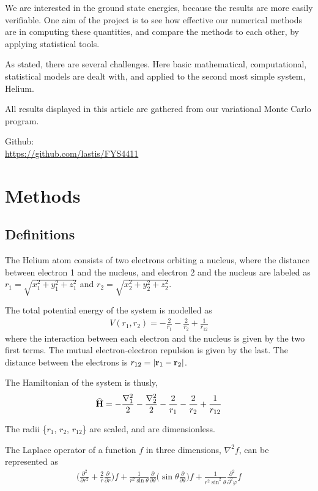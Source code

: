 \documentclass[twocolumn]{article}[10pt]
\newcommand{\eq}[1]{\begin{align*}#1\end{align*}}
\renewcommand\vec[1]{{\bf #1}}
\newcommand{\OP}[1]{{\bf\widehat{#1}}}
\begin{document}
We are interested in the ground state energies, because the
results are more easily verifiable. One aim of the project is
to see how effective our numerical methods are in computing
these quantities, and compare the methods to each other,
by applying statistical tools.

As stated, there are several challenges. Here basic mathematical,
computational, statistical models are dealt with, and applied to the second 
most simple system, Helium. 

All results displayed in this article are 
gathered from our variational Monte Carlo program. 

Github: \\ \url{https://github.com/lastis/FYS4411}

\section{Methods}
\subsection{Definitions}
The Helium atom consists of two electrons orbiting a nucleus,
where the distance between electron 1 and the nucleus,
and electron 2 and the nucleus are labeled as
$r_1 = \sqrt{x_1^2 + y_1^2 + z_1^2}$ 
and $r_2 = \sqrt{x_2^2 + y_2^2 + z_2^2}$.

The total potential energy of the system is modelled as
{\small
\eq{
    V(r_1,r_2)=-\frac{2}{r_1}-\frac{2}{r_2}+\frac{1}{r_{12}}
}}%
where the interaction between each electron and the nucleus
is given by the two first terms. 
The mutual electron-electron repulsion is given by the last.
The distance between the electrons is $r_{12}=|\vec r_1-\vec r_2|$.

The Hamiltonian of the system is thusly, 
{\small
\eq{
    \OP H = -\frac{\nabla_1 ^2}{2} -\frac{\nabla_2 ^2}{2}
    -\frac{2}{r_1}-\frac{2}{r_2}+\frac{1}{r_{12}}
}}%

The radii \{$r_1$, $r_2$, $r_{12}$\} are scaled, and are dimensionless.

The Laplace operator of a function $f$ in three dimensions, $\nabla^2 f$,
can be represented as
{\small
\eq{
  \bigg( \frac{\partial^2}{\partial r^2} 
    + \frac{2}{r} \frac{\partial}{\partial r} \bigg) f
    +\frac{1}{r^2 \sin\theta}\frac{\partial}{\partial \theta}
    \bigg( \sin\theta \frac{\partial}{\partial \theta}  \bigg) f
    +\frac{1}{r^2 \sin^2\theta}\frac{\partial^2}{\partial^2 \varphi} f
}}%
\end{document}
